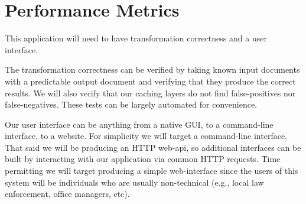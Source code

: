 %
%
\section*{Performance Metrics}

This application will need to have transformation correctness and a user interface.

The transformation correctness can be verified by taking known input documents with a predictable output document and verifying that they produce the correct results.
We will also verify that our caching layers do not find false-positives nor false-negatives.
These tests can be largely automated for convenience.

Our user interface can be anything from a native GUI, to a command-line interface, to a website.
For simplicity we will target a command-line interface.
That said we will be producing an HTTP web-api, so additional interfaces can be built by interacting with our application via common HTTP requests.
Time permitting we will target producing a simple web-interface since the users of this system will be individuals who are usually non-technical (e.g., local law enforcement, office managers, etc).

